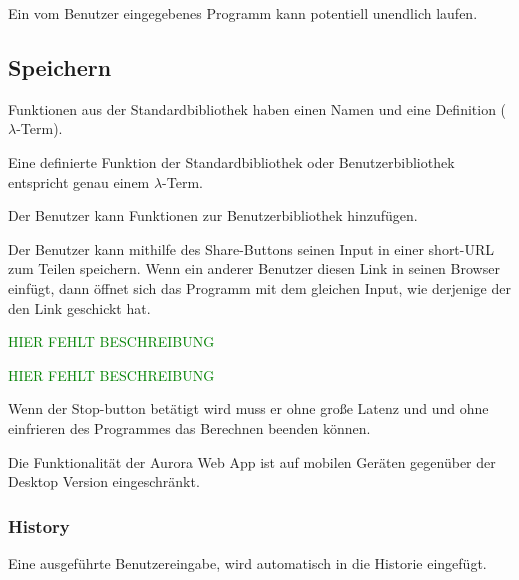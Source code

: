 \documentclass[parskip=full,11pt,twoside]{scrartcl}
\begin{document}

Ein vom Benutzer eingegebenes Programm kann potentiell unendlich laufen.

\subsection{Speichern}

Funktionen aus der Standardbibliothek haben einen Namen und eine Definition ($\lambda$-Term).

Eine definierte Funktion der Standardbibliothek oder Benutzerbibliothek entspricht genau einem $\lambda$-Term.

Der Benutzer kann Funktionen zur Benutzerbibliothek hinzufügen.


Der Benutzer kann mithilfe des Share-Buttons seinen Input in einer short-URL zum Teilen speichern. Wenn ein anderer Benutzer diesen Link in seinen Browser einfügt, dann öffnet sich das Programm mit dem gleichen Input, wie derjenige der den Link geschickt hat.

\textcolor{green}{HIER FEHLT BESCHREIBUNG}

\textcolor{green}{HIER FEHLT BESCHREIBUNG}

Wenn der Stop-button betätigt wird muss er ohne große Latenz und und ohne einfrieren des Programmes das Berechnen beenden können.


Die Funktionalität der Aurora Web App ist auf mobilen Geräten gegenüber der Desktop Version eingeschränkt.

\subsubsection{History}
Eine ausgeführte Benutzereingabe, wird automatisch in die Historie eingefügt.
\end{document}
